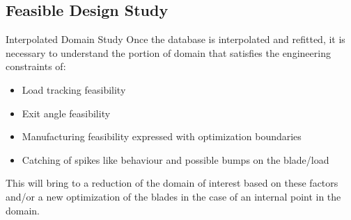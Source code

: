 \subsection{Feasible Design Study}

\begin{frame}{Interpolated Domain Study}
    Once the database is interpolated and refitted, it is necessary to understand the portion of domain that satisfies the engineering constraints of:
    \begin{itemize}
        \item Load tracking feasibility
        \item Exit angle feasibility
        \item Manufacturing feasibility expressed with optimization boundaries
        \item Catching of spikes like behaviour and possible bumps on the blade/load
    \end{itemize}
    This will bring to a reduction of the domain of interest based on these factors and/or a new optimization of the blades in the case of an internal point in the domain. 
\end{frame}
